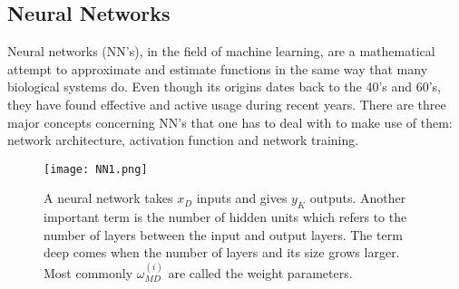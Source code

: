 \subsection{Neural Networks} \label{sec:NNs}
Neural networks (NN's), in the field of machine learning, are a mathematical attempt to approximate and estimate functions in the same way that many biological systems do. Even though its origins dates back to the 40's and 60's, they have found effective and active usage during recent years. There are three major concepts concerning NN's that one has to deal with to make use of them:  network architecture, activation function and network training.
\begin{figure}[tb] 
\centering 
\texttt{[image: NN1.png]} 
\caption[Neural network example architecture]{A neural network takes $x_D$ inputs and gives $y_K$ outputs. Another important term is the number of hidden units which refers to the number of layers between the input and output layers. The term deep comes when the number of layers and its size grows larger. Most commonly $\omega_{MD}^{(i)}$ are called the weight parameters.}
\label{fig:NNim1} 
\end{figure} 
